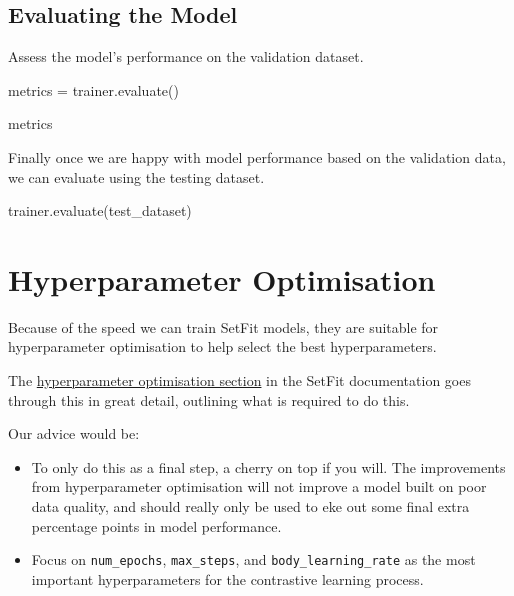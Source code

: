 \documentclass[
  letterpaper,
  DIV=11,
  numbers=noendperiod]{scrreprt}
\newenvironment{Shaded}{\begin{snugshade}}{\end{snugshade}}
\newcommand{\NormalTok}[1]{\textcolor[rgb]{0.00,0.23,0.31}{#1}}
\newcommand{\OperatorTok}[1]{\textcolor[rgb]{0.37,0.37,0.37}{#1}}
\begin{document}
\subsection{Evaluating the Model}\label{evaluating-the-model-2}

Assess the model's performance on the validation dataset.

\begin{Shaded}
\begin{Highlighting}[]
\NormalTok{metrics }\OperatorTok{=}\NormalTok{ trainer.evaluate()}

\NormalTok{metrics}
\end{Highlighting}
\end{Shaded}

Finally once we are happy with model performance based on the validation
data, we can evaluate using the testing dataset.

\begin{Shaded}
\begin{Highlighting}[]
\NormalTok{trainer.evaluate(test\_dataset)}
\end{Highlighting}
\end{Shaded}

\section{Hyperparameter Optimisation}\label{hyperparameter-optimisation}

Because of the speed we can train SetFit models, they are suitable for
hyperparameter optimisation to help select the best hyperparameters.

The
\href{https://huggingface.co/docs/setfit/en/how_to/hyperparameter_optimization}{hyperparameter
optimisation section} in the SetFit documentation goes through this in
great detail, outlining what is required to do this.

Our advice would be:

\begin{itemize}
\item
  To only do this as a final step, a cherry on top if you will. The
  improvements from hyperparameter optimisation will not improve a model
  built on poor data quality, and should really only be used to eke out
  some final extra percentage points in model performance.
\item
  Focus on \texttt{num\_epochs}, \texttt{max\_steps}, and
  \texttt{body\_learning\_rate} as the most important hyperparameters
  for the contrastive learning process.
\end{itemize}
\end{document}
